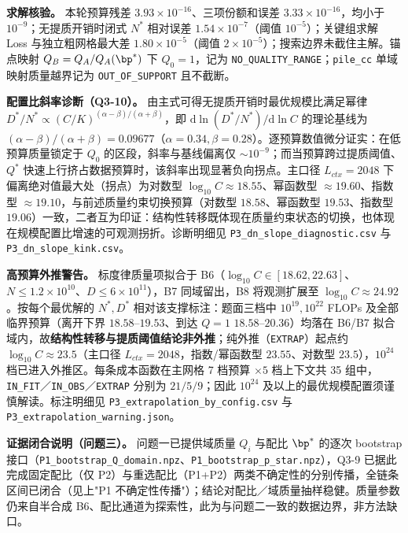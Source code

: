 \textbf{求解核验。} 本轮预算残差 $3.93\times10^{-16}$、三项份额和误差 $3.33\times10^{-16}$，均小于 $10^{-9}$；无提质开销时闭式 $N^*$ 相对误差 $1.54\times10^{-7}$（阈值 $10^{-5}$）；关键组求解 Loss 与独立粗网格最大差 $1.80\times10^{-5}$（阈值 $2\times10^{-5}$）；搜索边界未截住主解。锚点映射 $Q_B=Q_A/Q_A(\bp^*)$ 下 $Q_0=1$，记为 \texttt{NO\_QUALITY\_RANGE}；\texttt{pile\_cc} 单域映射质量越界记为 \texttt{OUT\_OF\_SUPPORT} 且不截断。

\textbf{配置比斜率诊断（Q3-10）。} 由主式可得无提质开销时最优规模比满足幂律 $D^*/N^*\propto (C/K)^{(\alpha-\beta)/(\alpha+\beta)}$，即 $\mathrm{d}\ln(D^*/N^*)/\mathrm{d}\ln C$ 的理论基线为 $(\alpha-\beta)/(\alpha+\beta)=0.09677$（$\alpha=0.34,\beta=0.28$）。逐预算数值微分证实：在低预算质量锁定于 $Q_0$ 的区段，斜率与基线偏离仅 $\sim10^{-9}$；而当预算跨过提质阈值、$Q^*$ 快速上行挤占数据预算时，该斜率出现显著负向拐点。主口径 $L_{ctx}=2048$ 下偏离绝对值最大处（拐点）为对数型 $\log_{10}C\approx18.55$、幂函数型 $\approx19.60$、指数型 $\approx19.10$，与前述质量约束切换预算（对数型 $18.58$、幂函数型 $19.53$、指数型 $19.06$）一致，二者互为印证：结构性转移既体现在质量约束状态的切换，也体现在规模配置比增速的可观测拐折。诊断明细见 \texttt{P3\_dn\_slope\_diagnostic.csv} 与 \texttt{P3\_dn\_slope\_kink.csv}。

\textbf{高预算外推警告。} 标度律质量项拟合于 B6（$\log_{10}C\in[18.62,22.63]$、$N\le1.2\times10^{10}$、$D\le6\times10^{11}$），B7 同域留出，B8 将观测扩展至 $\log_{10}C\approx24.92$。按每个最优解的 $N^*,D^*$ 相对该支撑标注：题面三档中 $10^{19},10^{22}$ FLOPs 及全部临界预算（离开下界 $18.58$–$19.53$、到达 $Q=1$ $18.58$–$20.36$）均落在 B6/B7 拟合域内，故\textbf{结构性转移与提质阈值结论非外推}；纯外推（\texttt{EXTRAP}）起点约 $\log_{10}C\approx23.5$（主口径 $L_{ctx}=2048$，指数/幂函数型 $23.55$、对数型 $23.5$），$10^{24}$ 档已进入外推区。每条成本函数在主网格 7 档预算 $\times5$ 档上下文共 35 组中，\texttt{IN\_FIT}／\texttt{IN\_OBS}／\texttt{EXTRAP} 分别为 $21/5/9$；因此 $10^{24}$ 及以上的最优规模配置须谨慎解读。标注明细见 \texttt{P3\_extrapolation\_by\_config.csv} 与 \texttt{P3\_extrapolation\_warning.json}。

\textbf{证据闭合说明（问题三）。} 问题一已提供域质量 $Q_i$ 与配比 $\bp^*$ 的逐次 bootstrap 接口（\texttt{P1\_bootstrap\_Q\_domain.npz}、\texttt{P1\_bootstrap\_p\_star.npz}），Q3-9 已据此完成固定配比（仅 P2）与重选配比（P1+P2）两类不确定性的分别传播，全链条区间已闭合（见上"P1 不确定性传播"）；结论对配比／域质量抽样稳健。质量参数仍来自半合成 B6、配比通道为探索性，此为与问题二一致的数据边界，非方法缺口。
